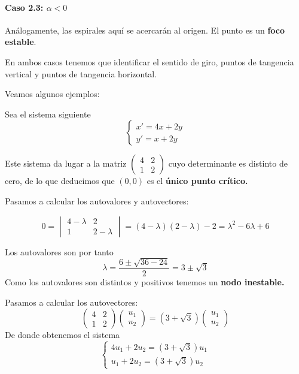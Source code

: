 \paragraph{Caso 2.3: $α<0$} Análogamente, las espirales aquí se acercarán al origen. El punto es un \textbf{foco estable}.

En ambos casos tenemos que identificar el sentido de giro, puntos de tangencia vertical y puntos de tangencia horizontal.

Veamos algunos ejemplos:

\begin{example}
Sea el sistema siguiente
\begin{equation*}
\left\lbrace 
\begin{array}{l}
	x' = 4x+2y\\
	y'=x+2y
\end{array}
\right. 
\end{equation*}

Este sistema da lugar a la matriz $\begin{pmatrix}
4& 2\\1& 2
\end{pmatrix}$
cuyo determinante es distinto de cero, de lo que deducimos que $(0,0)$ es el \textbf{único punto crítico.}

Pasamos a calcular los autovalores y autovectores:

$$0 = \begin{vmatrix}
4-\lambda& 2\\1& 2-\lambda
\end{vmatrix} = (4-\lambda)(2-\lambda)-2 = \lambda^2-6\lambda+6$$

Los autovalores son por tanto
$$\lambda = \frac{6\pm \sqrt{36-24}}{2} = 3\pm \sqrt{3}$$
Como los autovalores son distintos y positivos tenemos un \textbf{nodo inestable.}

Pasamos a calcular los autovectores:
$$\begin{pmatrix}
4& 2\\1& 2
\end{pmatrix}\begin{pmatrix}
u_1\\ u_2
\end{pmatrix}=(3+\sqrt{3})\begin{pmatrix}
u_1\\ u_2
\end{pmatrix}$$
De donde obtenemos el sistema 
\begin{equation*}
\left\lbrace 
\begin{array}{l}
	4u_1+2u_2=(3+\sqrt{3})u_1\\
	u_1+2u_2 = (3+\sqrt{3})u_2
\end{array}
\right. 
\end{equation*}


\end{example}
